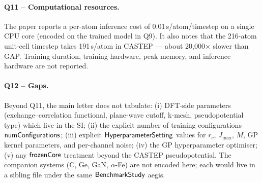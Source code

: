\paragraph{Q11 -- Computational resources.}
The paper reports a per-atom inference cost of 0.01\,s/atom/timestep
on a single CPU core (encoded on the trained model in Q9). It also
notes that the 216-atom unit-cell timestep takes 191\,s/atom in
CASTEP --- about 20{,}000$\times$ slower than GAP. Training duration,
training hardware, peak memory, and inference hardware are not
reported.


\paragraph{Q12 -- Gaps.}
Beyond Q11, the main letter does not tabulate: (i) DFT-side
parameters (exchange--correlation functional, plane-wave cutoff,
k-mesh, pseudopotential type) which live in the SI; (ii) the
explicit number of training configurations
$\mathsf{numConfigurations}$; (iii) explicit
$\mathsf{HyperparameterSetting}$ values for $r_c$, $J_{\max}$, $M$,
GP kernel parameters, and per-channel noise; (iv) the GP
hyperparameter optimiser; (v) any $\mathsf{frozenCore}$ treatment
beyond the CASTEP pseudopotential. The companion systems (C, Ge,
GaN, $\alpha$-Fe) are not encoded here; each would live in a
sibling file under the same $\mathsf{BenchmarkStudy}$ aegis.
